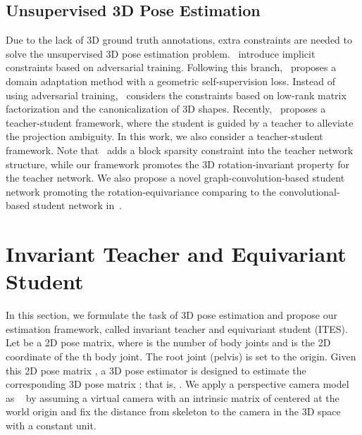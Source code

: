 \documentclass[letterpaper]{article} \usepackage{aaai21}  \usepackage{times}  \usepackage{helvet} \usepackage{courier}  \usepackage[hyphens]{url}  \usepackage{graphicx} \urlstyle{rm} \def\UrlFont{\rm}  \usepackage{natbib}  \usepackage{caption} \frenchspacing  \setlength{\pdfpagewidth}{8.5in}  \setlength{\pdfpageheight}{11in}
\begin{document}
\subsection{Unsupervised 3D Pose Estimation}
Due to the lack of 3D ground truth annotations, extra constraints are needed to solve the unsupervised 3D pose estimation problem.~\cite{drover2018can,kudo2018unsupervised} introduce implicit constraints based on adversarial training. Following this branch,~\cite{chen2019unsupervised} proposes a domain adaptation method with a geometric self-supervision loss. Instead of using adversarial training,~\cite{novotny2019c3dpo}
considers the constraints based on low-rank matrix factorization and the canonicalization of 3D shapes. Recently,~\cite{wang2019distill} proposes a teacher-student framework, where the student is guided by a teacher to alleviate the projection ambiguity. In this work, we also consider a teacher-student framework. Note that~\cite{wang2019distill} adds a block sparsity constraint into the teacher network structure, while our framework promotes the 3D rotation-invariant property for the teacher network. We also propose a novel graph-convolution-based student network promoting the rotation-equivariance comparing to the convolutional-based student network in~\cite{wang2019distill}.

\section{Invariant Teacher and Equivariant Student}
In this section, we formulate the task of 3D pose estimation and propose our estimation framework, called invariant teacher and equivariant student (ITES). Let  be a 2D pose matrix, where  is the number of body joints and  is the 2D coordinate of the th body joint. The root joint (pelvis) is set to the origin. Given this 2D pose matrix , a 3D pose estimator  is designed to estimate the corresponding 3D pose matrix  ; that is, . We apply a perspective camera model as ~\cite{chen2019unsupervised} by assuming a virtual camera with an intrinsic matrix of  centered at the world origin and fix the distance from skeleton to the camera in the 3D space with a constant  unit.
\end{document}
